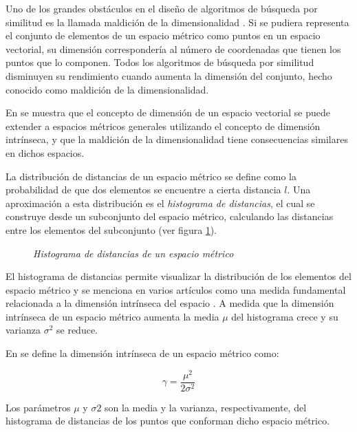 Uno de los grandes obst\'aculos en el dise\~no de algoritmos de b\'usqueda por similitud es la
llamada maldici\'on de la dimensionalidad \cite{oursurvey}. Si se pudiera representa el conjunto
de elementos de un espacio m\'etrico como puntos en un espacio vectorial, su dimensi\'on 
corresponder\'ia al n\'umero de coordenadas que tienen los puntos que lo componen. 
Todos los algoritmos de b\'usqueda por similitud disminuyen su rendimiento cuando aumenta la  dimensi\'on del conjunto, hecho conocido como maldici\'on de la dimensionalidad. 

En \cite{oursurvey} se muestra que
el concepto de dimensi\'on de un espacio vectorial se puede extender a espacios m\'etricos generales utilizando el concepto de dimensi\'on intr\'inseca, y que la maldici\'on de la dimensionalidad
tiene consecuencias similares en dichos espacios.


La distribuci\'on de distancias de un espacio m\'etrico se define como la probabilidad 
de que dos elementos se encuentre a cierta distancia $l$. Una aproximaci\'on a 
esta distribuci\'on es el \textit{histograma de distancias}, el cual se construye
 desde un subconjunto del espacio m\'etrico, calculando las distancias entre los elementos del subconjunto (ver figura \ref{defineH}).
 
 \begin{figure}[tb!]
\centerline{%
  }
  \caption [Histograma de distancias de un espacio m\'etrico]
  {\footnotesize {\textsl {Histograma de distancias de un espacio m\'etrico}}}
\label{defineH}
\end{figure}

El histograma de distancias permite visualizar la distribuci\'on de los 
elementos del espacio m\'etrico y se menciona en varios art\'iculos como una medida
 fundamental relacionada a la dimensi\'on intr\'inseca del espacio \cite{Bri95, CM97, cn00,alenex,CPZ98a}. A medida que la dimensi\'on intr\'inseca de un espacio m\'etrico aumenta
la media  $\mu$ del histograma crece y su varianza $\sigma^{2}$ se reduce.

\noindent En \cite{oursurvey} se define la dimensi\'on intr\'inseca de un espacio m\'etrico como:

\[
\gamma = \frac{\mu^2}{2\sigma^2}
\]

Los par\'ametros $\mu$ y $\sigma 2$ son la media y la varianza, respectivamente, del histograma de distancias de los puntos que conforman dicho espacio m\'etrico.



